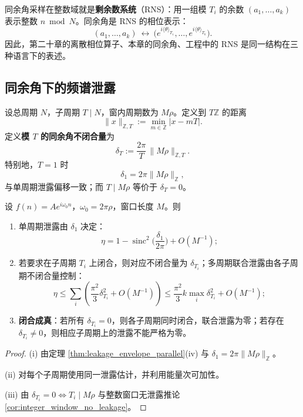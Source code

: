 \begin{remark}[同余角与剩余数系统]\label{rem:congruence_angle_rns}
同余角采样在整数域就是\textbf{剩余数系统}（RNS）：用一组模 $T_i$ 的余数 $(a_1,\dots,a_k)$ 表示整数 $n\bmod N$。同余角是 RNS 的相位表示：
\[
(a_1,\dots,a_k)\ \longleftrightarrow\ \big(e^{i\langle\theta\rangle_{T_1}},\dots,e^{i\langle\theta\rangle_{T_k}}\big).
\]
因此，第二十章的离散相位算子、本章的同余角、工程中的 RNS 是同一结构在三种语言下的表述。
\end{remark}

\subsection{同余角下的频谱泄露}

\begin{definition}[同余角不闭合]\label{def:congruence_angle_misclosure}
设总周期 $N$，子周期 $T\mid N$，窗内周期数为 $M\rho$。定义到 $T\mathbb{Z}$ 的距离
\[
\|x\|_{\mathbb{Z},T}:=\min_{m\in\mathbb{Z}}|x-mT|.
\]
定义\textbf{模 $T$ 的同余角不闭合量}为
\[
\delta_T:=\frac{2\pi}{T}\,\|M\rho\|_{\mathbb{Z},T}.
\]
特别地，$T=1$ 时
\[
\delta_1=2\pi\|M\rho\|_{\mathbb{Z}},
\]
与单周期泄露偏移一致；而 $T\mid M\rho$ 等价于 $\delta_T=0$。
\end{definition}

\begin{theorem}[同余角泄露公式]\label{thm:congruence_angle_leakage}
设 $f(n)=Ae^{i\omega_0 n}$，$\omega_0=2\pi\rho$，窗口长度 $M$。则
\begin{enumerate}[label=(\roman*)]
    \item 单周期泄露由 $\delta_1$ 决定：
    \[
    \eta=1-\operatorname{sinc}^2\!\Big(\frac{\delta_1}{2\pi}\Big)+O(M^{-1});
    \]
    \item 若要求在子周期 $T_i$ 上闭合，则对应不闭合量为 $\delta_{T_i}$；多周期联合泄露由各子周期不闭合量控制：
    \[
    \eta\le\sum_i\left(\frac{\pi^2}{3}\delta_{T_i}^2+O(M^{-1})\right)
    \le \frac{\pi^2}{3}k\max_i\delta_{T_i}^2+O(M^{-1});
    \]
    \item \textbf{闭合成真}：若所有 $\delta_{T_i}=0$，则各子周期同时闭合，联合泄露为零；若存在 $\delta_{T_i}\ne0$，则相应子周期上的泄露不能严格为零。
\end{enumerate}
\end{theorem}

\begin{proof}
(i) 由定理 \ref{thm:leakage_envelope_parallel}(iv) 与 $\delta_1=2\pi\|M\rho\|_{\mathbb{Z}}$。

(ii) 对每个子周期使用同一泄露估计，并利用能量次可加性。

(iii) 由 $\delta_{T_i}=0\iff T_i\mid M\rho$ 与整数窗口无泄露推论 \ref{cor:integer_window_no_leakage}。
\end{proof}

